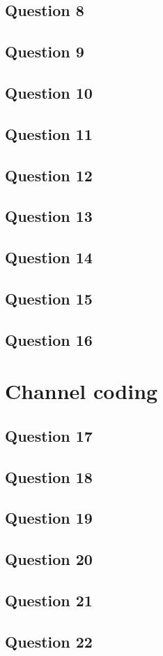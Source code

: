 \documentclass[]{template}
\begin{document}
    \subsection{Question 8}

    \subsection{Question 9}

    \subsection{Question 10}

    \subsection{Question 11}

    \subsection{Question 12}

    \subsection{Question 13}

    \subsection{Question 14}

    \subsection{Question 15}

    \subsection{Question 16}

\section{Channel coding}

    \subsection{Question 17}

    \subsection{Question 18}

    \subsection{Question 19}

    \subsection{Question 20}

    \subsection{Question 21}

    \subsection{Question 22}
\end{document}
